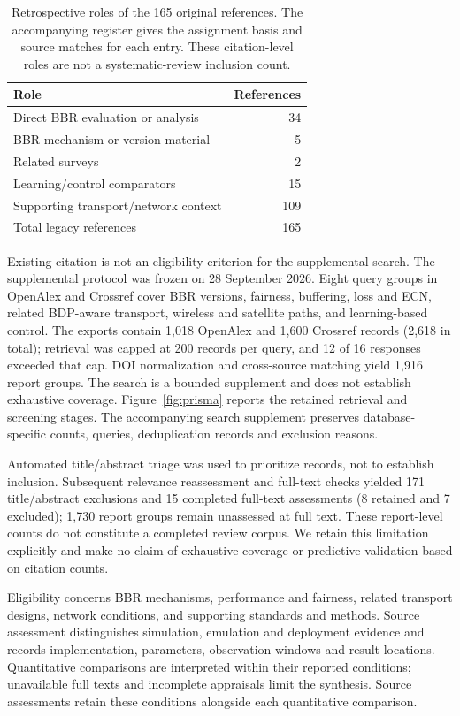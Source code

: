 \documentclass[a4paper,fleqn]{cas-sc}
\begin{document}
\begin{table}[htbp]
\centering
\small
\caption{Retrospective roles of the 165 original references. The accompanying
register gives the assignment basis and source matches for each entry.
These citation-level roles are not a systematic-review inclusion count.}
\label{tab:reference_roles}
\begin{tabular}{lr}
\toprule
Role & References \\
\midrule
Direct BBR evaluation or analysis & 34 \\
BBR mechanism or version material & 5 \\
Related surveys & 2 \\
Learning/control comparators & 15 \\
Supporting transport/network context & 109 \\
\midrule
Total legacy references & 165 \\
\bottomrule
\end{tabular}
\end{table}

Existing citation is not an eligibility criterion for the supplemental
search. The supplemental protocol was frozen on 28 September 2026. Eight query
groups in OpenAlex and Crossref cover BBR versions, fairness, buffering,
loss and ECN, related BDP-aware transport, wireless and satellite paths,
and learning-based control. The exports contain 1,018 OpenAlex and 1,600 Crossref records (2,618 in
total); retrieval
was capped at 200 records per query, and 12 of 16 responses exceeded that
cap. DOI normalization and cross-source matching yield 1,916 report groups.
The search is a bounded supplement and does not establish exhaustive coverage.
Figure~\ref{fig:prisma} reports the retained retrieval and screening stages.
The accompanying search supplement preserves database-specific counts,
queries, deduplication records and exclusion reasons.

Automated title/abstract triage was used to prioritize records, not to
establish inclusion. Subsequent relevance reassessment and full-text
checks yielded 171 title/abstract exclusions and 15 completed full-text
assessments (8 retained and 7 excluded); 1,730 report groups remain
unassessed at full text. These report-level counts do not constitute a
completed review corpus. We retain this limitation explicitly and make
no claim of exhaustive coverage or predictive validation based on
citation counts.

Eligibility concerns BBR mechanisms, performance and fairness, related
transport designs, network conditions, and supporting standards and
methods. Source assessment distinguishes simulation, emulation and
deployment evidence and records implementation, parameters, observation
windows and result locations. Quantitative comparisons are interpreted
within their reported conditions; unavailable full texts and incomplete
appraisals limit the synthesis. Source assessments retain these conditions alongside each quantitative
comparison.
\end{document}
